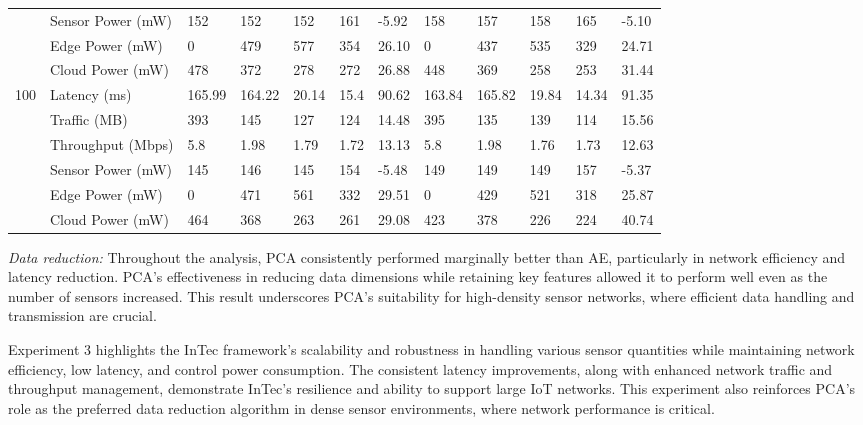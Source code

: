 \documentclass[11pt]{article}
\begin{document}
\begin{landscape}
\begin{table}[t]
{\begin{tabular}{llllllllllll}
					& Sensor Power (mW) & 152 & 152 & 152 & 161 & -5.92 & 158 & 157 & 158 & 165 & -5.10 \\
					& Edge Power (mW) & 0 & 479 & 577 & 354 & 26.10 & 0 & 437 & 535 & 329 & 24.71 \\
					& Cloud Power (mW) & 478 & 372 & 278 & 272 & 26.88 & 448 & 369 & 258 & 253 & 31.44 \\
					\midrule
					\multirow{6}{*}{100} & Latency (ms) & 165.99 & 164.22 & 20.14 & 15.4 & 90.62 & 163.84 & 165.82 & 19.84 & 14.34 & 91.35 \\
					& Traffic (MB) & 393 & 145 & 127 & 124 & 14.48 & 395 & 135 & 139 & 114 & 15.56 \\
					& Throughput (Mbps) & 5.8 & 1.98 & 1.79 & 1.72 & 13.13 & 5.8 & 1.98 & 1.76 & 1.73 & 12.63 \\
					& Sensor Power (mW) & 145 & 146 & 145 & 154 & -5.48 & 149 & 149 & 149 & 157 & -5.37 \\
					& Edge Power (mW) & 0 & 471 & 561 & 332 & 29.51 & 0 & 429 & 521 & 318 & 25.87 \\
					& Cloud Power (mW) & 464 & 368 & 263 & 261 & 29.08 & 423 & 378 & 226 & 224 & 40.74 \\
					\bottomrule
				\end{tabular}
			}
		\end{table}
	\end{landscape}	
	
	
	

	

	\textit{Data reduction:} Throughout the analysis, PCA consistently performed marginally better than AE, particularly in network efficiency and latency reduction. PCA’s
	effectiveness in reducing data dimensions while retaining key features allowed it
	to perform well even as the number of sensors increased. This result underscores
	PCA’s suitability for high-density sensor networks, where efficient data handling
	and transmission are crucial.
	
	Experiment 3 highlights the InTec framework’s scalability and robustness in handling various sensor quantities while maintaining network efficiency, low latency,
	and control power consumption. The consistent latency improvements, along with
	enhanced network traffic and throughput management, demonstrate InTec’s resilience and ability to support large IoT networks. This experiment also reinforces
	PCA’s role as the preferred data reduction algorithm in dense sensor environments,
	where network performance is critical.
	
\end{document}
